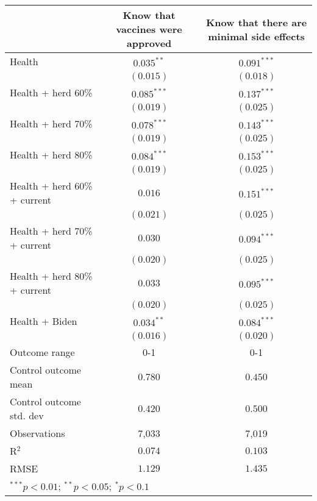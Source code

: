 \begin{table}
\begin{center}
\begin{tabular}{l c c}
\hline
 & Know that vaccines were approved & Know that there are minimal side effects \\
\hline
Health                       & $0.035^{**}$  & $0.091^{***}$ \\
                             & $(0.015)$     & $(0.018)$     \\
Health + herd 60\%           & $0.085^{***}$ & $0.137^{***}$ \\
                             & $(0.019)$     & $(0.025)$     \\
Health + herd 70\%           & $0.078^{***}$ & $0.143^{***}$ \\
                             & $(0.019)$     & $(0.025)$     \\
Health + herd 80\%           & $0.084^{***}$ & $0.153^{***}$ \\
                             & $(0.019)$     & $(0.025)$     \\
Health + herd 60\% + current & $0.016$       & $0.151^{***}$ \\
                             & $(0.021)$     & $(0.025)$     \\
Health + herd 70\% + current & $0.030$       & $0.094^{***}$ \\
                             & $(0.020)$     & $(0.025)$     \\
Health + herd 80\% + current & $0.033$       & $0.095^{***}$ \\
                             & $(0.020)$     & $(0.025)$     \\
Health + Biden               & $0.034^{**}$  & $0.084^{***}$ \\
                             & $(0.016)$     & $(0.020)$     \\
\hline
Outcome range                & 0-1           & 0-1           \\
Control outcome mean         & $0.780$       & $0.450$       \\
Control outcome std. dev     & $0.420$       & $0.500$       \\
Observations                 & 7,033         & 7,019         \\
R$^{2}$                      & $0.074$       & $0.103$       \\
RMSE                         & $1.129$       & $1.435$       \\
\hline
\multicolumn{3}{l}{\scriptsize{$^{***}p<0.01$; $^{**}p<0.05$; $^{*}p<0.1$}}
\end{tabular}
\caption{}
\label{table:Tables and Figures/SI_table2_manip_A}
\end{center}
\end{table}
